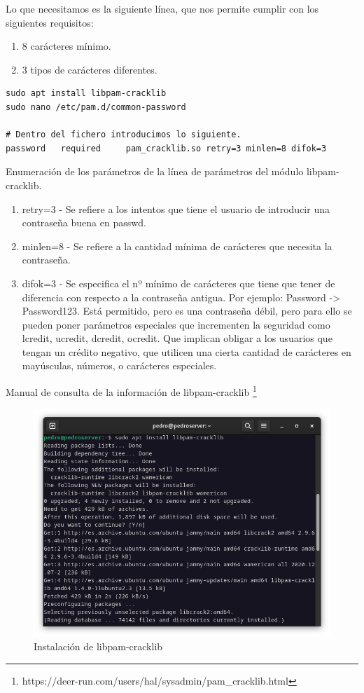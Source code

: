 Lo que necesitamos es la siguiente línea, que nos permite cumplir con los siguientes requisitos:

\begin{enumerate}
\item 8 carácteres mínimo.
\item 3 tipos de carácteres diferentes.
\end{enumerate}


\begin{lstlisting}[style=mybash]
sudo apt install libpam-cracklib
sudo nano /etc/pam.d/common-password

# Dentro del fichero introducimos lo siguiente.
password   required     pam_cracklib.so retry=3 minlen=8 difok=3
\end{lstlisting}
    
Enumeración de los parámetros de la línea de parámetros del módulo libpam-cracklib.

\begin{enumerate}
\item retry=3 - Se refiere a los intentos que tiene el usuario de introducir una contraseña buena en passwd.
\item minlen=8 - Se refiere a la cantidad mínima de carácteres que necesita la contraseña.
\item difok=3 - Se especifica el nº mínimo de carácteres que tiene que tener de diferencia con respecto a la contraseña antigua. Por ejemplo: Password -> Password123. Está permitido, pero es una contraseña débil, pero para ello se pueden poner parámetros especiales que incrementen la seguridad como lcredit, ucredit, dcredit, ocredit. Que implican obligar a los usuarios que tengan un crédito negativo, que utilicen una cierta cantidad de carácteres en mayúsculas, números, o carácteres especiales.
\end{enumerate}

Manual de consulta de la información de libpam-cracklib \footnote{https://deer-run.com/users/hal/sysadmin/pam\_cracklib.html}

\begin{figure}[H]
	\centering
	\includegraphics[scale=0.30]{01}
	\caption{Instalación de libpam-cracklib}
\end{figure}

